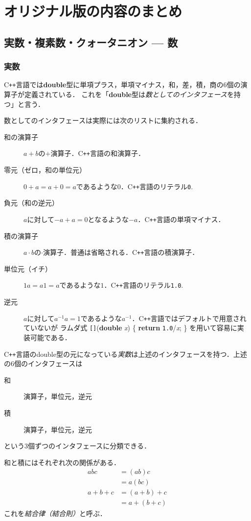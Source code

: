 \documentclass{jsbook}
\newcommand{\cxx}{\textrm{C}\texttt{++}}
\newcommand{\cliteral}[1]{\texttt{#1}}
\newcommand{\ckeyword}[1]{\textbf{#1}}
\newcommand{\cid}[1]{\textit{#1}}
\newcommand{\keyword}[1]{\emph{#1}}
\begin{document}
\setcounter{chapter}{-1}
\chapter{オリジナル版の内容のまとめ}

\section{実数・複素数・クォータニオン --- 数}

\subsection{実数}

\cxx 言語では\ckeyword{double}型に単項プラス，単項マイナス，和，差，積，商の6個の演算子が定義されている．
これを「\ckeyword{double}型は\keyword{数としてのインタフェース}を持つ」と言う．

数としてのインタフェースは実際には次のリストに集約される．
\begin{description}
\item[和の演算子] $a+b$の$+$演算子．\cxx 言語の和演算子．
\item[零元（ゼロ，和の単位元）] $0+a=a+0=a$であるような$0$．\cxx 言語のリテラル\cliteral{0}.
\item[負元（和の逆元）] $a$に対して$-a+a=0$となるような$-a$．\cxx 言語の単項マイナス．
\item[積の演算子] $a\cdot b$の$\cdot$演算子．普通は省略される．\cxx 言語の積演算子．
\item[単位元（イチ）] $1a=a1=a$であるような$1$．\cxx 言語のリテラル\cliteral{1.0}.
\item[逆元] $a$に対して$a^{-1}a=1$であるような$a^{-1}$．\cxx 言語ではデフォルトで用意されていないが
ラムダ式 \texttt{[]}(\ckeyword{double} \cid{x}) \{ \ckeyword{return} \cliteral{1.0}/\cid{x}; \} を用いて容易に実装可能である．
\end{description}
\cxx 言語のdouble型の元になっている\keyword{実数}は上述のインタフェースを持つ．上述の6個のインタフェースは
\begin{description}
\item[和] 演算子，単位元，逆元
\item[積] 演算子，単位元，逆元
\end{description}
という3個ずつのインタフェースに分類できる．

和と積にはそれぞれ次の関係がある．
\begin{align}
abc&=(ab)c\\
  &=a(bc)\\
a+b+c&=(a+b)+c\\
  &=a+(b+c)
\end{align}
これを\keyword{結合律（結合則）}と呼ぶ．
\end{document}
